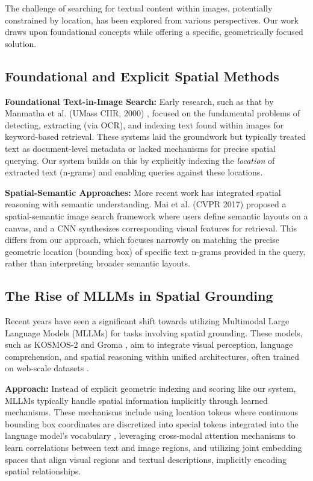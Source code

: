 \documentclass[manuscript,screen]{acmart}
\begin{document}
The challenge of searching for textual content within images, potentially constrained by location, has been explored from various perspectives. Our work draws upon foundational concepts while offering a specific, geometrically focused solution.

\subsection{Foundational and Explicit Spatial Methods}

\textbf{Foundational Text-in-Image Search:} Early research, such as that by Manmatha et al. (UMass CIIR, 2000) \cite{Manmatha00}, focused on the fundamental problems of detecting, extracting (via OCR), and indexing text found within images for keyword-based retrieval. These systems laid the groundwork but typically treated text as document-level metadata or lacked mechanisms for precise spatial querying. Our system builds on this by explicitly indexing the \textit{location} of extracted text (n-grams) and enabling queries against these locations.

\textbf{Spatial-Semantic Approaches:} More recent work has integrated spatial reasoning with semantic understanding. Mai et al. (CVPR 2017) \cite{Mai17} proposed a spatial-semantic image search framework where users define semantic layouts on a canvas, and a CNN synthesizes corresponding visual features for retrieval. This differs from our approach, which focuses narrowly on matching the precise geometric location (bounding box) of specific text n-grams provided in the query, rather than interpreting broader semantic layouts.

\subsection{The Rise of MLLMs in Spatial Grounding}

Recent years have seen a significant shift towards utilizing Multimodal Large Language Models (MLLMs) for tasks involving spatial grounding. These models, such as KOSMOS-2 \cite{Huang24} and Groma \cite{Yin24}, aim to integrate visual perception, language comprehension, and spatial reasoning within unified architectures, often trained on web-scale datasets \cite{Huang24}.

\textbf{Approach:} Instead of explicit geometric indexing and scoring like our system, MLLMs typically handle spatial information implicitly through learned mechanisms. These mechanisms include using location tokens where continuous bounding box coordinates are discretized into special tokens integrated into the language model's vocabulary \cite{Huang24}, leveraging cross-modal attention mechanisms to learn correlations between text and image regions, and utilizing joint embedding spaces that align visual regions and textual descriptions, implicitly encoding spatial relationships.
\end{document}
